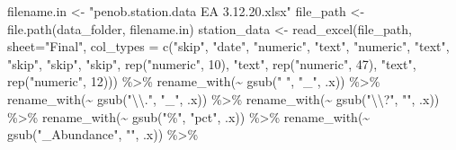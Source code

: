 \documentclass[
]{article}
\newenvironment{Shaded}{\begin{snugshade}}{\end{snugshade}}
\newcommand{\AttributeTok}[1]{\textcolor[rgb]{0.77,0.63,0.00}{#1}}
\newcommand{\DecValTok}[1]{\textcolor[rgb]{0.00,0.00,0.81}{#1}}
\newcommand{\FunctionTok}[1]{\textcolor[rgb]{0.00,0.00,0.00}{#1}}
\newcommand{\NormalTok}[1]{#1}
\newcommand{\OtherTok}[1]{\textcolor[rgb]{0.56,0.35,0.01}{#1}}
\newcommand{\SpecialCharTok}[1]{\textcolor[rgb]{0.00,0.00,0.00}{#1}}
\newcommand{\StringTok}[1]{\textcolor[rgb]{0.31,0.60,0.02}{#1}}
\begin{document}
\begin{Shaded}
\begin{Highlighting}[]
\NormalTok{filename.in }\OtherTok{\textless{}{-}} \StringTok{"penob.station.data EA 3.12.20.xlsx"}
\NormalTok{file\_path }\OtherTok{\textless{}{-}} \FunctionTok{file.path}\NormalTok{(data\_folder, filename.in)}
\NormalTok{station\_data }\OtherTok{\textless{}{-}} \FunctionTok{read\_excel}\NormalTok{(file\_path, }
                           \AttributeTok{sheet=}\StringTok{"Final"}\NormalTok{, }\AttributeTok{col\_types =} \FunctionTok{c}\NormalTok{(}\StringTok{"skip"}\NormalTok{, }\StringTok{"date"}\NormalTok{, }
                                              \StringTok{"numeric"}\NormalTok{, }\StringTok{"text"}\NormalTok{, }\StringTok{"numeric"}\NormalTok{, }
                                              \StringTok{"text"}\NormalTok{, }\StringTok{"skip"}\NormalTok{, }\StringTok{"skip"}\NormalTok{, }
                                              \StringTok{"skip"}\NormalTok{, }
                                              \FunctionTok{rep}\NormalTok{(}\StringTok{"numeric"}\NormalTok{, }\DecValTok{10}\NormalTok{),}
                                              \StringTok{"text"}\NormalTok{, }
                                              \FunctionTok{rep}\NormalTok{(}\StringTok{"numeric"}\NormalTok{, }\DecValTok{47}\NormalTok{),}
                                              \StringTok{"text"}\NormalTok{,}
                                              \FunctionTok{rep}\NormalTok{(}\StringTok{"numeric"}\NormalTok{, }\DecValTok{12}\NormalTok{))) }\SpecialCharTok{\%\textgreater{}\%}
  \FunctionTok{rename\_with}\NormalTok{(}\SpecialCharTok{\textasciitilde{}} \FunctionTok{gsub}\NormalTok{(}\StringTok{" "}\NormalTok{, }\StringTok{"\_"}\NormalTok{, .x)) }\SpecialCharTok{\%\textgreater{}\%}
  \FunctionTok{rename\_with}\NormalTok{(}\SpecialCharTok{\textasciitilde{}} \FunctionTok{gsub}\NormalTok{(}\StringTok{"}\SpecialCharTok{\textbackslash{}\textbackslash{}}\StringTok{."}\NormalTok{, }\StringTok{"\_"}\NormalTok{, .x)) }\SpecialCharTok{\%\textgreater{}\%}
  \FunctionTok{rename\_with}\NormalTok{(}\SpecialCharTok{\textasciitilde{}} \FunctionTok{gsub}\NormalTok{(}\StringTok{"}\SpecialCharTok{\textbackslash{}\textbackslash{}}\StringTok{?"}\NormalTok{, }\StringTok{""}\NormalTok{, .x)) }\SpecialCharTok{\%\textgreater{}\%}
  \FunctionTok{rename\_with}\NormalTok{(}\SpecialCharTok{\textasciitilde{}} \FunctionTok{gsub}\NormalTok{(}\StringTok{"\%"}\NormalTok{, }\StringTok{"pct"}\NormalTok{, .x)) }\SpecialCharTok{\%\textgreater{}\%}
  \FunctionTok{rename\_with}\NormalTok{(}\SpecialCharTok{\textasciitilde{}} \FunctionTok{gsub}\NormalTok{(}\StringTok{"\_Abundance"}\NormalTok{, }\StringTok{""}\NormalTok{, .x)) }\SpecialCharTok{\%\textgreater{}\%}

\end{Highlighting}
\end{Shaded}
\end{document}
